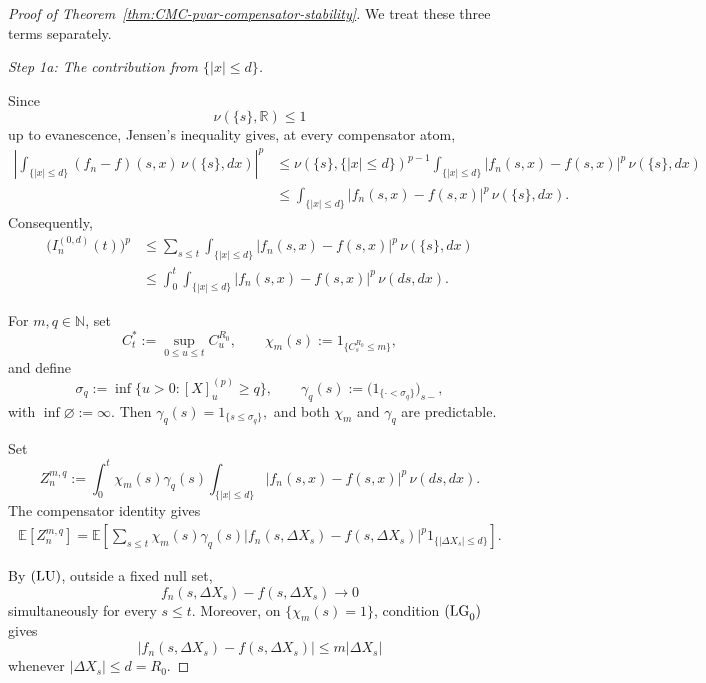 \documentclass[a4paper,10pt]{article}
\newcommand{\E}{\mathbb E}
\begin{document}
\begin{proof}[Proof of Theorem~\ref{thm:CMC-pvar-compensator-stability}]
We treat these three terms separately.

\medskip
\noindent
\textit{Step 1a: The contribution from \(\{|x|\le d\}\).}
\medskip

Since
\[
        \nu(\{s\},\mathbb R)\le1
\]
up to evanescence, Jensen's inequality gives, at every compensator
atom,
\[
\begin{aligned}
\left|
\int_{\{|x|\le d\}}
(f_n-f)(s,x)\,\nu(\{s\},dx)
\right|^p
&\le
\nu(\{s\},\{|x|\le d\})^{p-1}
\int_{\{|x|\le d\}}
|f_n(s,x)-f(s,x)|^p\,\nu(\{s\},dx)
\\
&\le
\int_{\{|x|\le d\}}
|f_n(s,x)-f(s,x)|^p\,\nu(\{s\},dx).
\end{aligned}
\]
Consequently,
\begin{align*}
\bigl(I_n^{(0,d)}(t)\bigr)^p
&\le
\sum_{s\le t}\int_{\{|x|\le d\}}
|f_n(s,x)-f(s,x)|^p\,\nu(\{s\},dx)
\\
&\le
\int_0^t\int_{\{|x|\le d\}}
|f_n(s,x)-f(s,x)|^p\,\nu(ds,dx).
\end{align*}

For \(m,q\in\mathbb N\), set
\[
        C_t^*
        :=
        \sup_{0\le u\le t}C^{R_0}_u,
        \qquad
        \chi_m(s)
        :=
        1_{\{C^{R_0}_s\le m\}},
\]
and define
\[
        \sigma_q
        :=
        \inf\{u>0:[X]^{(p)}_u\ge q\},
        \qquad
        \gamma_q(s)
        :=
        \bigl(1_{\{\cdot<\sigma_q\}}\bigr)_{s-},
\]
with \(\inf\varnothing:=\infty\). Then
$
        \gamma_q(s)=1_{\{s\le\sigma_q\}},
$
and both \(\chi_m\) and \(\gamma_q\) are predictable.

Set
\[
Z_n^{m,q}
:=
\int_0^t
\chi_m(s)\gamma_q(s)
\int_{\{|x|\le d\}}
|f_n(s,x)-f(s,x)|^p\,\nu(ds,dx).
\]
The compensator identity gives
\[
\begin{aligned}
\E[Z_n^{m,q}]
=
\E\left[
\sum_{s\le t}
\chi_m(s)\gamma_q(s)
|f_n(s,\Delta X_s)-f(s,\Delta X_s)|^p
1_{\{|\Delta X_s|\le d\}}
\right].
\end{aligned}
\]

By \({\rm (LU)}\), outside a fixed null set,
\[
        f_n(s,\Delta X_s)-f(s,\Delta X_s)
        \longrightarrow0
\]
simultaneously for every \(s\le t\). Moreover, on
\(\{\chi_m(s)=1\}\), condition \({\rm (LG}_0{\rm )}\) gives
\[
|f_n(s,\Delta X_s)-f(s,\Delta X_s)|
\le
m|\Delta X_s|
\]
whenever \(|\Delta X_s|\le d=R_0\).


\end{proof}
\end{document}
